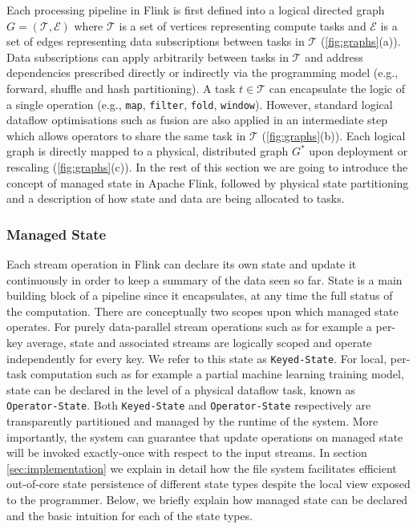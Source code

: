 Each processing pipeline in Flink is first defined into a logical directed graph $G = (\mathcal{T}, \mathcal{E})$ where $\mathcal{T}$ is a set of vertices representing compute tasks and $\mathcal{E}$ is a set of edges representing data subscriptions between tasks in $\mathcal{T}$ (\autoref{fig:graphs}(a)). Data subscriptions can apply arbitrarily between tasks in $\mathcal{T}$ and address dependencies prescribed directly or indirectly via the programming model (e.g., forward, shuffle and hash partitioning). A task $t \in \mathcal{T}$ can encapsulate the logic of a single operation (e.g., \texttt{map}, \texttt{filter}, \texttt{fold}, \texttt{window}). However, standard logical dataflow optimisations  such as fusion \cite{hirzel2014catalog,chambers2010flumejava} are also applied in an intermediate step which allows operators to share the same task in $\mathcal{T}$ (\autoref{fig:graphs}(b)). Each logical graph is directly mapped to a physical, distributed graph $G^*$ upon deployment or rescaling (\autoref{fig:graphs}(c)). In the rest of this section we are going to introduce the concept of managed state in Apache Flink, followed by physical state partitioning and a description of how state and data are being allocated to tasks.



\subsubsection{Managed State}
\label{sec:managedstate}
Each stream operation in Flink can declare its own state and update it continuously in order to keep a summary of the data seen so far. State is a main building block of a pipeline since it encapsulates, at any time the full status of the computation. There are conceptually two scopes upon which managed state operates. For purely data-parallel stream operations such as for example a per-key average, state and associated streams are logically scoped and operate independently for every key. We refer to this state as \texttt{Keyed-State}. For local, per-task computation such as for example a partial machine learning training model, state can be declared in the level of a physical dataflow task, known as \texttt{Operator-State}. Both \texttt{Keyed-State} and \texttt{Operator-State} respectively are transparently partitioned and managed by the runtime of the system. More importantly, the system can guarantee that update operations on managed state will be invoked exactly-once with respect to the input streams. In section \ref{sec:implementation} we explain in detail how the file system facilitates efficient out-of-core state persistence of different state types despite the local  view exposed to the programmer. Below, we briefly explain how managed state can be declared and the basic intuition for each of the state types. 

